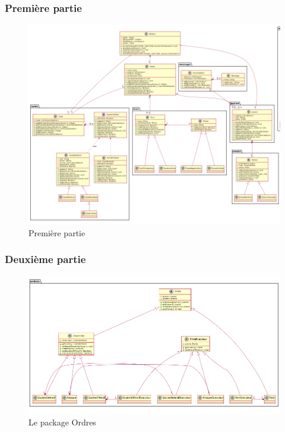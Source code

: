 		\subsubsection{Première partie}
			\vspace{10mm}
			\begin{figure}[!h]
				\centering
				\includegraphics[angle=90,width=150mm]{images/DP1.png}
				\caption{Première partie}
			\end{figure}

		\newpage

		\subsubsection{Deuxième partie}
			\vspace{10mm}
			\begin{figure}[!h]
				\centering
				\includegraphics[scale=0.4]{images/DP2.png}
				\caption{Le package Ordres}
			\end{figure}

